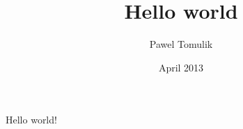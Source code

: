 \documentclass{article}
\title{Hello world}
\author{Pawel Tomulik}
\date{April 2013}
\begin{document}
  \maketitle
  Hello world!
\end{document}
